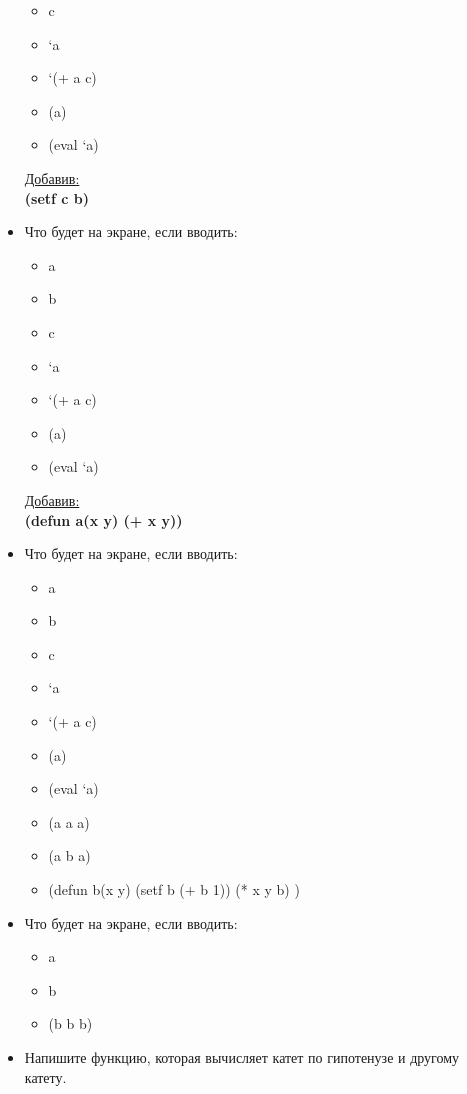 \begin{itemize}
\begin{itemize}
			\item c
			\item `a
			\item `(+ a c)
			\item (a)
			\item (eval `a)
		\end{itemize}
	\underline{Добавив:}\\
	\textbf{(setf c b)}
	\item Что будет на экране, если вводить:
		\begin{itemize}
			\item a
			\item b
			\item c
			\item `a
			\item `(+ a c)
			\item (a)
			\item (eval `a)
		\end{itemize}
	\underline{Добавив:}\\
	\textbf{(defun a(x y) (+ x y))}
	\item Что будет на экране, если вводить:
		\begin{itemize}
			\item a
			\item b
			\item c
			\item `a
			\item `(+ a c)
			\item (a)
			\item (eval `a)
			\item (a a a)
			\item (a b a)
		\end{itemize}
	\hrulefill 
\begin{itemize}
	\item (defun b(x y) (setf b (+ b 1)) (* x y b) ) 
\end{itemize}
	\hrulefill
	\item Что будет на экране, если вводить:
		\begin{itemize}
			\item a
			\item b
			\item (b b b)
		\end{itemize}
	\item Напишите функцию, которая вычисляет катет по гипотенузе и другому катету.
\end{itemize}